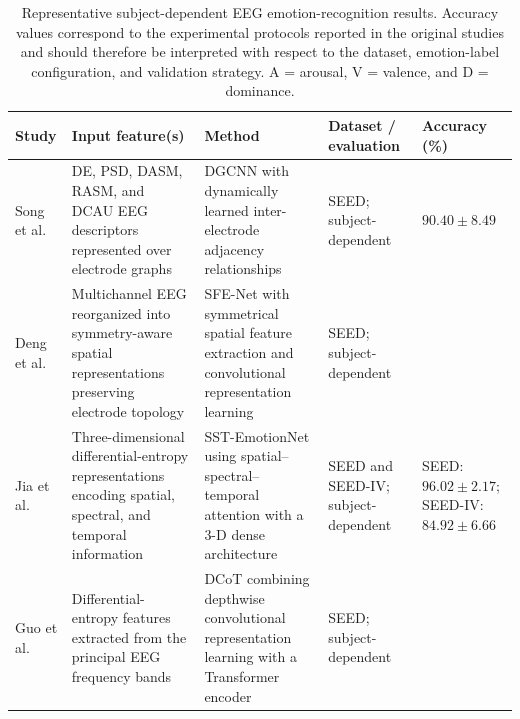 \documentclass{WileyMSP-template}
\newcommand{\lightrowsep}{%
    \arrayrulecolor{lightrowgray}%
    \specialrule{0.30pt}{3.5pt}{3.5pt}%
    \arrayrulecolor{black}%
}
\begin{document}
\begin{table}
\centering

\caption{Representative subject-dependent EEG emotion-recognition results.
Accuracy values correspond to the experimental protocols reported in the original studies
and should therefore be interpreted with respect to the dataset, emotion-label configuration,
and validation strategy. A = arousal, V = valence, and D = dominance.}

\label{tab:subject_dependent_results}

\scriptsize
\setlength{\tabcolsep}{3.0pt}
\renewcommand{\arraystretch}{1.18}

\begin{tabularx}{\textheight}{
>{\raggedright\arraybackslash}p{3.15cm}
>{\raggedright\arraybackslash}X
>{\raggedright\arraybackslash}X
>{\raggedright\arraybackslash}p{3.65cm}
>{\raggedright\arraybackslash}p{5.15cm}}

\toprule

\textbf{Study} &
\textbf{Input feature(s)} &
\textbf{Method} &
\textbf{Dataset / evaluation} &
\textbf{Accuracy (\%)} \\

\midrule

Song et al. \cite{song2020dgcnn} &
DE, PSD, DASM, RASM, and DCAU EEG descriptors represented over electrode graphs &
DGCNN with dynamically learned inter-electrode adjacency relationships &
SEED; subject-dependent &
$90.40 \pm 8.49$ \\

\lightrowsep

Deng et al. \cite{deng2021sfenet} &
Multichannel EEG reorganized into symmetry-aware spatial representations preserving electrode topology &
SFE-Net with symmetrical spatial feature extraction and convolutional representation learning &
SEED; subject-dependent &
99.19 \\

\lightrowsep

Jia et al. \cite{jia2020sstemotionnet} &
Three-dimensional differential-entropy representations encoding spatial, spectral, and temporal information &
SST-EmotionNet using spatial--spectral--temporal attention with a 3-D dense architecture &
SEED and SEED-IV; subject-dependent &
SEED: $96.02 \pm 2.17$;
SEED-IV: $84.92 \pm 6.66$ \\

\lightrowsep

Guo et al. \cite{guo2022dcot} &
Differential-entropy features extracted from the principal EEG frequency bands &
DCoT combining depthwise convolutional representation learning with a Transformer encoder &
SEED; subject-dependent &
93.83 \\


\end{tabularx}
\end{table}
\end{document}
